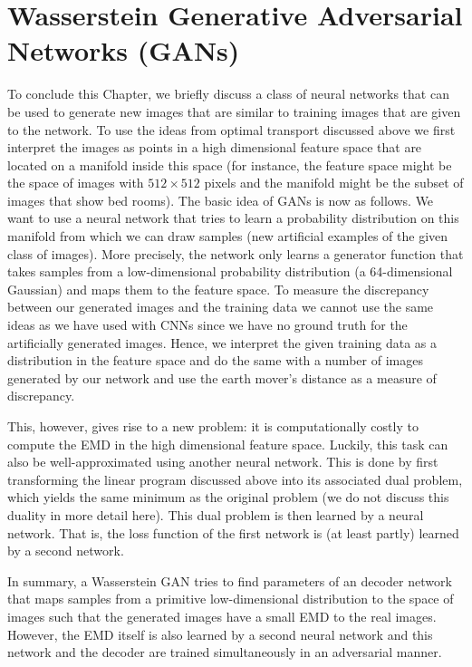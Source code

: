 \section{Wasserstein Generative Adversarial Networks (GANs)}
To conclude this Chapter, we briefly discuss a class of neural networks that can
be used to generate new images that are similar to training images that are
given to the network. To use the ideas from optimal transport discussed above we
first interpret the images as points in a high dimensional feature space that
are located on a manifold inside this space (for instance, the feature space
might be the space of images with $512 \times 512$ pixels and the manifold might
be the subset of images that show bed rooms). The basic idea of GANs is now as
follows. We want to use a neural network that tries to learn a probability
distribution on this manifold from which we can draw samples (\ie new artificial
examples of the given class of images). More precisely, the network only learns
a generator function that takes samples from a low-dimensional probability
distribution (\eg a 64-dimensional Gaussian) and maps them to the feature space.
To measure the discrepancy between our generated images and the training data we
cannot use the same ideas as we have used with CNNs since we have no ground
truth for the artificially generated images. Hence, we interpret the given
training data as a distribution in the feature space and do the same with a
number of images generated by our network and use the earth mover's distance as
a measure of discrepancy.

This, however, gives rise to a new problem: it is computationally costly to
compute the EMD in the high dimensional feature space. Luckily, this task can
also be well-approximated using another neural network. This is done by first
transforming the linear program discussed above into its associated dual
problem, which yields the same minimum as the original problem (we do not
discuss this duality in more detail here). This dual problem is then learned by
a neural network. That is, the loss function of the first network is (at least
partly) learned by a second network.

In summary, a Wasserstein GAN tries to find parameters of an decoder network
that maps samples from a primitive low-dimensional distribution to the space of
images such that the generated images have a small EMD to the real
images. However, the EMD itself is also learned by a second neural network and
this network and the decoder are trained simultaneously in an adversarial
manner.

